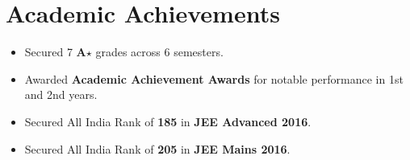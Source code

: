 \section*{Academic Achievements}
\begin{itemize}

\item Secured 7 \textbf{A$\star$} grades across 6 semesters.
\item Awarded \textbf{Academic Achievement Awards} for notable performance in 1st and 2nd years.
\item Secured All India Rank of {\bf 185} in {\bf JEE Advanced 2016}.
\item Secured All India Rank of {\bf 205} in {\bf JEE Mains 2016}.

\end{itemize}
